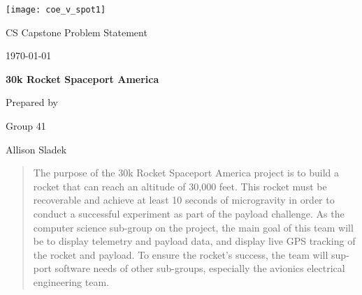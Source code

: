 \documentclass[onecolumn, draftclsnofoot,10pt, compsoc]{IEEEtran}
\def \CapstoneTeamName{		CS 30K Avionics}
\def \CapstoneTeamNumber{		41}
\def \GroupMemberOne{			Allison Sladek}
\def \GroupMemberTwo{			Levi Willmeth}
\def \GroupMemberThree{			Joshua Novak}
\def \CapstoneProjectName{		30k Rocket Spaceport America}
\def \CapstoneSponsorCompany{	Oregon State Univesity}
\def \CapstoneSponsorPerson{		Nancy Squires}
\def \DocType{		Problem Statement
				}
\newcommand{\NameSigPair}[1]{\par
\makebox[2.75in][r]{#1} \hfil 	\makebox[3.25in]{\makebox[2.25in]{\hrulefill} \hfill		\makebox[.75in]{\hrulefill}}
\par\vspace{-12pt} \textit{\tiny\noindent
\makebox[2.75in]{} \hfil		\makebox[3.25in]{\makebox[2.25in][r]{Signature} \hfill	\makebox[.75in][r]{Date}}}}
\renewcommand{\NameSigPair}[1]{#1}
\begin{document}
\begin{titlepage}
    \begin{singlespace}
    	\texttt{[image: coe\_v\_spot1]}
        \hfill
        \par\vspace{.2in}
        \centering
        \scshape{
            \huge CS Capstone \DocType \par
            {\large\today}\par
            \vspace{.5in}
            \textbf{\Huge\CapstoneProjectName}\par
            \vfill
            {\large Prepared by }\par
            Group\CapstoneTeamNumber\par
            \vspace{5pt}
            {\Large
                \NameSigPair{\GroupMemberOne}\par
            }
            \vspace{20pt}
        }
        \begin{abstract}
        The purpose of the 30k Rocket Spaceport America project is to build a rocket that can reach an altitude of 30,000 feet.
        This rocket must be recoverable and achieve at least 10 seconds of microgravity in order to conduct a successful experiment as part of the payload challenge.
        As the computer science sub-group on the project, the main goal of this team will be to display telemetry and payload data, and display live GPS tracking of the rocket and payload.
        To ensure the rocket’s success, the team will sup- port software needs of other sub-groups, especially the avionics electrical engineering team.

        \end{abstract}
    \end{singlespace}
\end{titlepage}
\newpage
{}
\tableofcontents
\clearpage
\end{document}
